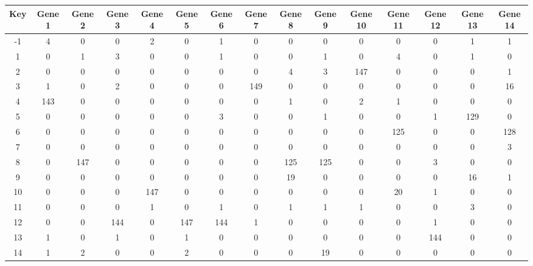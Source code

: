 \begin{tabular}{|c|c|c|c|c|c|c|c|c|c|c|c|c|c|c|}
\hline
Key & Gene 1 & Gene 2 & Gene 3 & Gene 4 & Gene 5 & Gene 6 & Gene 7 & Gene 8 & Gene 9 & Gene 10 & Gene 11 & Gene 12 & Gene 13 & Gene 14 \\
\hline
-1 & 4 & 0 & 0 & 2 & 0 & 1 & 0 & 0 & 0 & 0 & 0 & 0 & 1 & 1 \\
1 & 0 & 1 & 3 & 0 & 0 & 1 & 0 & 0 & 1 & 0 & 4 & 0 & 1 & 0 \\
2 & 0 & 0 & 0 & 0 & 0 & 0 & 0 & 4 & 3 & 147 & 0 & 0 & 0 & 1 \\
3 & 1 & 0 & 2 & 0 & 0 & 0 & 149 & 0 & 0 & 0 & 0 & 0 & 0 & 16 \\
4 & 143 & 0 & 0 & 0 & 0 & 0 & 0 & 1 & 0 & 2 & 1 & 0 & 0 & 0 \\
5 & 0 & 0 & 0 & 0 & 0 & 3 & 0 & 0 & 1 & 0 & 0 & 1 & 129 & 0 \\
6 & 0 & 0 & 0 & 0 & 0 & 0 & 0 & 0 & 0 & 0 & 125 & 0 & 0 & 128 \\
7 & 0 & 0 & 0 & 0 & 0 & 0 & 0 & 0 & 0 & 0 & 0 & 0 & 0 & 3 \\
8 & 0 & 147 & 0 & 0 & 0 & 0 & 0 & 125 & 125 & 0 & 0 & 3 & 0 & 0 \\
9 & 0 & 0 & 0 & 0 & 0 & 0 & 0 & 19 & 0 & 0 & 0 & 0 & 16 & 1 \\
10 & 0 & 0 & 0 & 147 & 0 & 0 & 0 & 0 & 0 & 0 & 20 & 1 & 0 & 0 \\
11 & 0 & 0 & 0 & 1 & 0 & 1 & 0 & 1 & 1 & 1 & 0 & 0 & 3 & 0 \\
12 & 0 & 0 & 144 & 0 & 147 & 144 & 1 & 0 & 0 & 0 & 0 & 1 & 0 & 0 \\
13 & 1 & 0 & 1 & 0 & 1 & 0 & 0 & 0 & 0 & 0 & 0 & 144 & 0 & 0 \\
14 & 1 & 2 & 0 & 0 & 2 & 0 & 0 & 0 & 19 & 0 & 0 & 0 & 0 & 0 \\
\hline
\end{tabular}